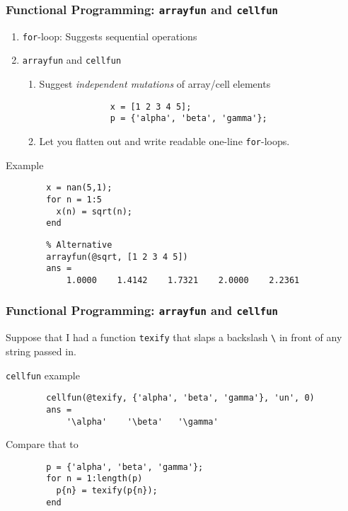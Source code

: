\documentclass{beamer}
\begin{document}
  \begin{frame}[fragile]
    \frametitle{Functional Programming: \texttt{arrayfun} and \texttt{cellfun}}

    \begin{enumerate}
      \item \texttt{for}-loop: Suggests sequential operations\pause
      \item \texttt{arrayfun} and \texttt{cellfun}
        \begin{enumerate}
          \item Suggest \emph{independent mutations} of array/cell elements
            \begin{lstlisting}
              x = [1 2 3 4 5];
              p = {'alpha', 'beta', 'gamma'};
            \end{lstlisting}
          \item Let you flatten out and write readable one-line \texttt{for}-loops.
        \end{enumerate}\pause
    \end{enumerate}
    \vspace{10pt}
    Example
      \begin{lstlisting}
        x = nan(5,1);
        for n = 1:5
          x(n) = sqrt(n);
        end
      \end{lstlisting}\pause
      \begin{lstlisting}
        % Alternative
        arrayfun(@sqrt, [1 2 3 4 5])
        ans =
            1.0000    1.4142    1.7321    2.0000    2.2361
      \end{lstlisting}

	\end{frame}

  \begin{frame}[fragile]
    \frametitle{Functional Programming: \texttt{arrayfun} and \texttt{cellfun}}

    Suppose that I had a function \texttt{texify} that slaps a backslash
    \texttt{\textbackslash} in front of any string passed in.\pause

    \vspace{20pt}
    \texttt{cellfun} example
      \begin{lstlisting}
        cellfun(@texify, {'alpha', 'beta', 'gamma'}, 'un', 0)
        ans =
            '\alpha'    '\beta'   '\gamma'
      \end{lstlisting}\pause
    Compare that to
      \begin{lstlisting}
        p = {'alpha', 'beta', 'gamma'};
        for n = 1:length(p)
          p{n} = texify(p{n});
        end
      \end{lstlisting}
	\end{frame}
\end{document}
